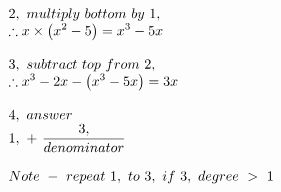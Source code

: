 \documentclass{article}
\begin{document}
\begin{multicols}{2}
\[\begin{array}{>{\displaystyle}l}
        2,\ multiply\ bottom\ by\ 1,\ \\
        \therefore x\times \left( x^{2} -5\right) =x^{3} -5x\\
        \\
        3,\ subtract\ top\ from\ 2,\ \\
        \therefore x^{3} -2x-\left( x^{3} -5x\right) =3x\\
        \\
        4,\ answer\ \\
        1,\ +\ \frac{3,}{denominator}\\
        \\
        Note\ -\ repeat\ 1,\ to\ 3,\ if\ 3,\ degree\  >\ 1\ 
    \end{array}
    \]
\end{multicols}
\end{document}
